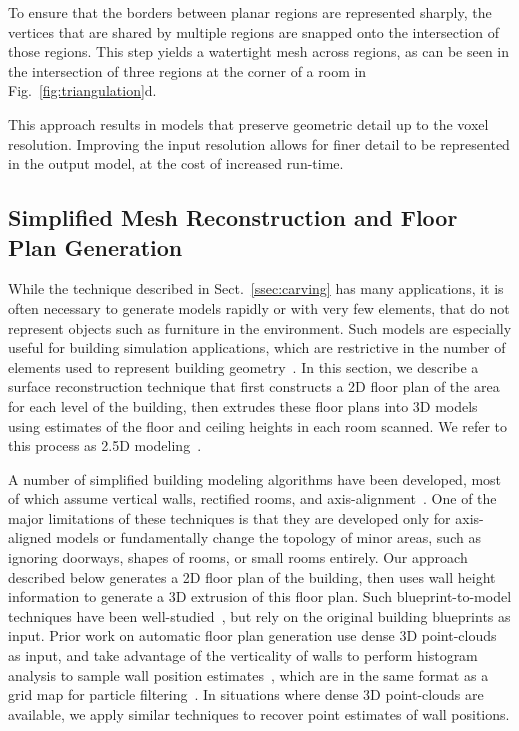 \documentclass[journal]{IEEEtran}
\begin{document}
To ensure that the borders between planar regions are represented sharply, the vertices that are shared by multiple regions are snapped onto the intersection of those regions.  This step yields a watertight mesh across regions, as can be seen in the intersection of three regions at the corner of a room in Fig.~\ref{fig:triangulation}d.

This approach results in models that preserve geometric detail up to the voxel resolution.  Improving the input resolution allows for finer detail to be represented in the output model, at the cost of increased run-time.

\subsection{Simplified Mesh Reconstruction and Floor Plan Generation}
\label{ssec:floorplan}

While the technique described in Sect.~\ref{ssec:carving} has many applications, it is often necessary to generate models rapidly or with very few elements, that do not represent objects such as furniture in the environment.  Such models are especially useful for building simulation applications, which are restrictive in the number of elements used to represent building geometry~\cite{EnergyPlus}.  In this section, we describe a surface reconstruction technique that first constructs a 2D floor plan of the area for each level of the building, then extrudes these floor plans into 3D models using estimates of the floor and ceiling heights in each room scanned.  We refer to this process as 2.5D modeling~\cite{Turner14}.


A number of simplified building modeling algorithms have been developed, most of which assume vertical walls, rectified rooms, and axis-alignment~\cite{Museums,WallFinder}.  One of the major limitations of these techniques is that they are developed only for axis-aligned models or fundamentally change the topology of minor areas, such as ignoring doorways, shapes of rooms, or small rooms entirely.  Our approach described below generates a 2D floor plan of the building, then uses wall height information to generate a 3D extrusion of this floor plan.  Such blueprint-to-model techniques have been well-studied~\cite{Or05,Lewis98}, but rely on the original building blueprints as input.  Prior work on automatic floor plan generation use dense 3D point-clouds as input, and take advantage of the verticality of walls to perform histogram analysis to sample wall position estimates~\cite{Okorn09,Eigencrust}, which are in the same format as a grid map for particle filtering~\cite{toro05}.  In situations where dense 3D point-clouds are available, we apply similar techniques to recover point estimates of wall positions.
\end{document}
